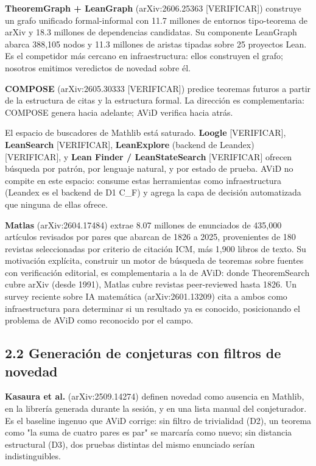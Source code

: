 \documentclass[12pt,a4paper]{article}
\theoremstyle{remark}
\begin{document}
\textbf{TheoremGraph + LeanGraph} (arXiv:2606.25363 [VERIFICAR]) construye un grafo unificado formal-informal con 11.7 millones de entornos tipo-teorema de arXiv y 18.3 millones de dependencias candidatas. Su componente LeanGraph abarca 388,105 nodos y 11.3 millones de aristas tipadas sobre 25 proyectos Lean. Es el competidor más cercano en infraestructura: ellos construyen el grafo; nosotros emitimos veredictos de novedad sobre él.


\textbf{COMPOSE} (arXiv:2605.30333 [VERIFICAR]) predice teoremas futuros a partir de la estructura de citas y la estructura formal. La dirección es complementaria: COMPOSE genera hacia adelante; AViD verifica hacia atrás.


El espacio de buscadores de Mathlib está saturado. \textbf{Loogle} [VERIFICAR], \textbf{LeanSearch} [VERIFICAR], \textbf{LeanExplore} (backend de Leandex) [VERIFICAR], y \textbf{Lean Finder / LeanStateSearch} [VERIFICAR] ofrecen búsqueda por patrón, por lenguaje natural, y por estado de prueba. AViD no compite en este espacio: consume estas herramientas como infraestructura (Leandex es el backend de D1 C\_F) y agrega la capa de decisión automatizada que ninguna de ellas ofrece.


\textbf{Matlas} (arXiv:2604.17484) extrae 8.07 millones de enunciados de 435,000 artículos revisados por pares que abarcan de 1826 a 2025, provenientes de 180 revistas seleccionadas por criterio de citación ICM, más 1,900 libros de texto. Su motivación explícita, construir un motor de búsqueda de teoremas sobre fuentes con verificación editorial, es complementaria a la de AViD: donde TheoremSearch cubre arXiv (desde 1991), Matlas cubre revistas peer-reviewed hasta 1826. Un survey reciente sobre IA matemática (arXiv:2601.13209) cita a ambos como infraestructura para determinar si un resultado ya es conocido, posicionando el problema de AViD como reconocido por el campo.


\subsection{2.2 Generación de conjeturas con filtros de novedad}

\textbf{Kasaura et al.} (arXiv:2509.14274) definen novedad como ausencia en Mathlib, en la librería generada durante la sesión, y en una lista manual del conjeturador. Es el baseline ingenuo que AViD corrige: sin filtro de trivialidad (D2), un teorema como "la suma de cuatro pares es par" se marcaría como nuevo; sin distancia estructural (D3), dos pruebas distintas del mismo enunciado serían indistinguibles.
\end{document}
